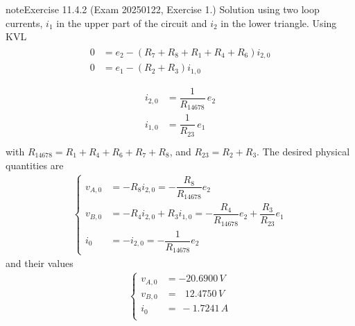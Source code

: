 \documentclass[letterpaper,10pt,english]{jupyterBook}
\begin{document}
\begin{sphinxadmonition}{note}{Exercise 11.4.2 (Exam 2025\sphinxhyphen{}01\sphinxhyphen{}22, Exercise 1.)}
\sphinxAtStartPar
Solution using two loop currents, \(i_1\) in the upper part of the circuit and \(i_2\) in the lower triangle. Using KVL
\begin{equation*}
\begin{split}\begin{aligned}
  0 & = e_2 - (R_7+R_8+R_1+R_4+R_6) i_{2,0} \\
  0 & = e_1 - (R_2+R_3) i_{1,0} \\
\end{aligned}
\end{split}
\end{equation*}\begin{equation*}
\begin{split}
\begin{aligned}
  i_{2,0} & = \dfrac{1}{R_{14678}} \, e_2 \\
  i_{1,0} & = \dfrac{1}{R_{23}} \, e_1 \\
\end{aligned}\end{split}
\end{equation*}
\sphinxAtStartPar
with \(R_{14678} = R_1+R_4+R_6+R_7+R_8\), and \(R_{23} = R_2 + R_3\). The desired physical quantities are
\begin{equation*}
\begin{split}\begin{cases}
  v_{A,0} & = - R_8 i_{2,0} = -\dfrac{R_8}{R_{14678}} e_2 \\ 
  v_{B,0} & = - R_4 i_{2,0} + R_3 i_{1,0} = - \dfrac{R_4}{R_{14678}} e_2 + \dfrac{R_3}{R_{23}} e_1 \\
  i_{0} & = - i_{2,0} = - \dfrac{1}{R_{14678}} e_2
\end{cases}\end{split}
\end{equation*}
\sphinxAtStartPar
and their values
\begin{equation*}
\begin{split}\begin{cases}
 v_{A,0} & =     - 20.6900 \, V \\
 v_{B,0} & = \ \ \ 12.4750 \, V \\
   i_{0} & = \    - 1.7241 \, A \\
\end{cases}\end{split}
\end{equation*}
\begin{figure}[htbp]
\centering

\noindent{}
\end{figure}

\end{sphinxadmonition}
\end{document}
